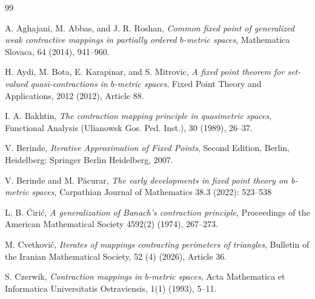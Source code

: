 \documentclass[a4paper,12pt,oneside]{article}
\numberwithin{equation}{section}
\begin{document}
\begin{thebibliography}{99}

A. Aghajani, M. Abbas, and J. R. Roshan, \textit{Common fixed point of generalized weak contractive mappings in partially ordered $b$-metric spaces}, Mathematica Slovaca, 64 (2014), 941--960.


H. Aydi, M. Bota, E. Karapinar, and S. Mitrovic, \textit{A fixed point theorem for set-valued quasi-contractions in $b$-metric spaces}, Fixed Point Theory and Applications, 2012 (2012), Article 88.

I. A. Bakhtin, \textit{The contraction mapping principle in quasimetric spaces}, Functional Analysis (Ulianowsk Gos. Ped. Inst.), 30 (1989), 26--37.

V. Berinde, \textit{Iterative Approximation of Fixed Points}, Second Edition, Berlin, Heidelberg: Springer Berlin Heidelberg, 2007.

V. Berinde and M. Păcurar, \textit{The early developments in fixed point theory on b-metric spaces}, Carpathian Journal of Mathematics 38.3 (2022): 523--538

L. B. Ćirić, \textit{A generalization of Banach's contraction principle}, Proceedings of the American Mathematical Society 4592(2) (1974), 267--273.


M. Cvetković, \textit{Iterates of mappings contracting perimeters of triangles}, Bulletin of the Iranian Mathematical Society, 52 (4) (2026), Article 36.

S. Czerwik, \textit{Contraction mappings in $b$-metric spaces}, Acta Mathematica et Informatica Universitatis Ostraviensis, 1(1) (1993), 5--11.



\end{thebibliography}
\end{document}
